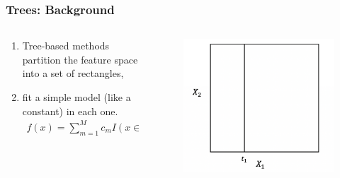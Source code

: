 \documentclass[
  shownotes,
  xcolor={svgnames},
  hyperref={colorlinks,citecolor=DarkBlue,linkcolor=DarkRed,urlcolor=DarkBlue}
  ]{beamer}
\begin{document}
\begin{frame}[fragile]
\frametitle{Trees: Background}


\begin{columns}[T] %
\begin{column}{.42\textwidth}
  
\begin{enumerate}
\item Tree-based methods partition the feature space into a set of rectangles,
\item  fit a simple model (like a constant) in each one. 
\begin{align}
f(x) = \sum_{m=1}^M c_m I(x\in R_m)
\end{align}
\end{enumerate}


\end{column}  
\hfill
\begin{column}{.48\textwidth}

 \begin{figure}[H] \centering
            \captionsetup{justification=centering}
              \includegraphics[scale=0.4]{figures/cart_2}                           
 \end{figure}

\end{column}
\end{columns}

\end{frame}
\end{document}
